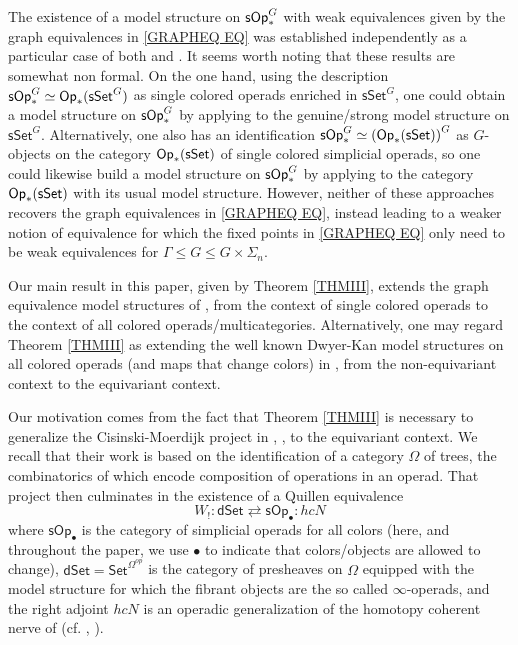 \documentclass[a4paper,10pt
,draft
]{article}%
\numberwithin{equation}{section}
\numberwithin{figure}{section}
\theoremstyle{definition} %
\newcommand{\1}{\ensuremath{\mathbbm 1}}%
\begin{document}
The existence of a model structure 
on $\mathsf{sOp}^G_{\**}$
with weak equivalences given by the graph equivalences
in \eqref{GRAPHEQ EQ}
was established independently as a particular case of both
\cite[Thm. I]{BP_geo} and \cite[Thm. 3.1]{GW18}.
It seems worth noting that these results are somewhat non formal.
On the one hand, using the description 
$\mathsf{sOp}_{\**}^G \simeq \mathsf{Op}_{\**}(\mathsf{sSet}^G)$
as single colored operads enriched in 
$\mathsf{sSet}^G$,
one could obtain a model structure
on $\mathsf{sOp}_{\**}^G$
by applying \cite[Thm. 3.2]{BM03}
to the genuine/strong model structure on $\mathsf{sSet}^G$.
Alternatively, one also has an identification
$\mathsf{sOp}_{\**}^G \simeq 
\left(\mathsf{Op}_{\**}(\mathsf{sSet})\right)^G$
as $G$-objects on the category
$\mathsf{Op}_{\**}(\mathsf{sSet})$
of single colored simplicial operads,
so one could likewise build a model structure on 
$\mathsf{sOp}_{\**}^G$
by applying \cite[Prop. 2.6]{Ste16}
to the category
$\mathsf{Op}_{\**}(\mathsf{sSet})$
with its usual model structure.
However, neither of these approaches
recovers the graph equivalences in \eqref{GRAPHEQ EQ},
instead leading to a weaker notion of equivalence for which the fixed points in \eqref{GRAPHEQ EQ}
only need to be weak equivalences for
$\Gamma \leq G \leq G \times \Sigma_n$.


Our main result in this paper, 
given by Theorem \ref{THMIII}, 
extends the graph equivalence model structures of
\cite[Thm. I]{BP_geo}, \cite[Thm. 3.1]{GW18}
from the context of single colored operads 
to the context of all colored operads/multicategories.
Alternatively, one may regard Theorem \ref{THMIII} as extending the well known Dwyer-Kan model structures on all colored operads (and maps that change colors) in
\cite[Thm 1.14]{CM13b}, \cite[Thm. 2]{Rob11}
from the non-equivariant context to the 
equivariant context.


Our motivation comes from the fact that 
Theorem \ref{THMIII} is necessary to 
generalize the Cisinski-Moerdijk project in
\cite{CM11}, \cite{CM13a}, \cite{CM13b} to the equivariant context.
We recall that their work is based on the identification of a category
$\Omega$ of trees, 
the combinatorics of which encode
composition of operations in an operad.
That project then culminates in the existence of a Quillen equivalence
\begin{equation}\label{CMMAINTHM EQ}
	W_!\colon \mathsf{dSet} \rightleftarrows \mathsf{sOp}_{\bullet} \colon hcN
\end{equation}
where 
$\mathsf{sOp}_{\bullet}$
is the category of simplicial operads for all colors
(here, and throughout the paper, we use $\bullet$ to indicate 
that colors/objects are allowed to change),
$\mathsf{dSet} = \mathsf{Set}^{\Omega^{op}}$
is the category of presheaves on $\Omega$
equipped with the model structure for which the fibrant objects are the so called $\infty$-operads,
and the right adjoint $hcN$ is an operadic generalization of the homotopy coherent nerve of \cite{Cor82} (cf. \cite{Joy}, \cite[\S 1.1.5]{Lur09}).
\end{document}
